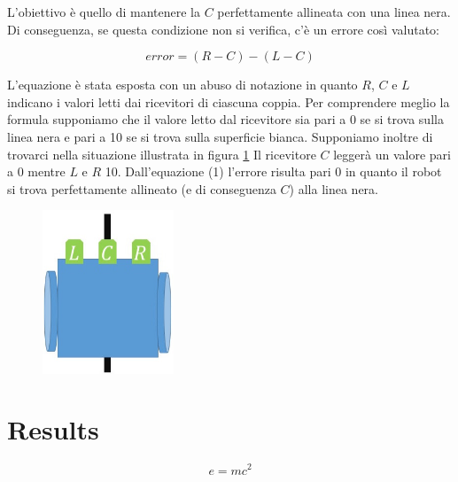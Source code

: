 \documentclass[twoside,twocolumn]{article}
\begin{document}
L'obiettivo è quello di mantenere la $C$ perfettamente allineata con una linea nera. Di conseguenza, se questa condizione non si verifica, c'è un errore così valutato:

\begin{equation}
error = (R - C) - (L - C)
\end{equation}

L'equazione è stata esposta con un abuso di notazione in quanto $R$, $C$ e $L$ indicano i valori letti dai ricevitori di ciascuna coppia. Per comprendere meglio la formula supponiamo che il valore letto dal ricevitore sia pari a 0 se si trova sulla linea nera e pari a 10 se si trova sulla superficie bianca. Supponiamo inoltre di trovarci nella situazione illustrata in figura \ref{fig:t0}
Il ricevitore $C$ leggerà un valore pari a 0 mentre $L$ e $R$ 10. Dall'equazione (1) l'errore risulta pari 0 in quanto il robot si trova perfettamente allineato (e di conseguenza $C$) alla linea nera.

\begin{figure}[h]
	\centering
	\includegraphics[width=0.35\textwidth]{immagini/t0}
	\caption{}
	\label{fig:t0}
\end{figure}








\section{Results}


\blindtext %

\begin{equation}
\label{eq:emc}
e = mc^2
\end{equation}

\blindtext %

\end{document}
